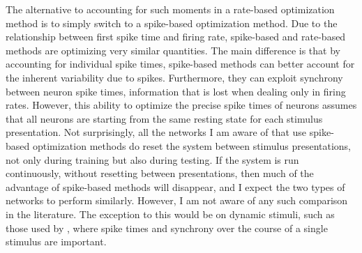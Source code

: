 The alternative to accounting for such moments in a rate-based optimization method
is to simply switch to a spike-based optimization method.
Due to the relationship between first spike time and firing rate,
spike-based and rate-based methods are optimizing very similar quantities.
The main difference is that by accounting for individual spike times,
spike-based methods can better account for the inherent variability due to spikes.
Furthermore, they can exploit synchrony between neuron spike times,
information that is lost when dealing only in firing rates.
However, this ability to optimize the precise spike times of neurons
assumes that all neurons are starting
from the same resting state for each stimulus presentation.
Not surprisingly, all the networks I am aware of
that use spike-based optimization methods
do reset the system between stimulus presentations,
not only during training but also during testing.
If the system is run continuously, without resetting between presentations,
then much of the advantage of spike-based methods will disappear,
and I expect the two types of networks to perform similarly.
However, I am not aware of any such comparison in the literature.
The exception to this would be on dynamic stimuli,
such as those used by \textcite{Huh2017},
where spike times and synchrony over the course of a single stimulus are important.


